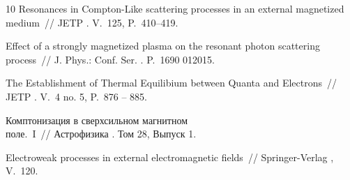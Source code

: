 \documentclass[a4paper]{panl}
\begin{document}
\begin{thebibliography}{10}
 {Resonances in Compton-Like scattering processes in an external magnetized medium}~//
JETP
\BibDash
{}. \BibDash
\newblock V.~125, \BibDash
\newblock P.~410--419.

 {Effect of a strongly magnetized plasma on the resonant photon scattering process}~//
J. Phys.: Conf. Ser.
\BibDash
{}. \BibDash
\newblock P.~1690 012015.

 {The Establishment of Thermal Equilibium between Quanta and Electrons}~//
JETP
\BibDash
{}. \BibDash
\newblock V.~4 no. 5, \BibDash
\newblock P.~876 -- 885.

 {Комптонизация в сверхсильном магнитном \\поле.~I}~//
Астрофизика
\BibDash
{}. \BibDash
\newblock Том 28, \BibDash
\newblock Выпуск 1.

 {Electroweak processes in external electromagnetic fields}~//
Springer-Verlag
\BibDash
{}, \BibDash
\newblock V.~120.


\end{thebibliography}
\end{document}
